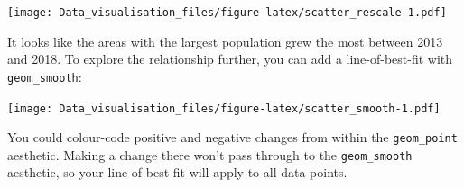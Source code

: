 \documentclass[]{book}
\newenvironment{Shaded}{\begin{snugshade}}{\end{snugshade}}
\newcommand{\CommentTok}[1]{\textcolor[rgb]{0.56,0.35,0.01}{\textit{#1}}}
\newcommand{\DataTypeTok}[1]{\textcolor[rgb]{0.13,0.29,0.53}{#1}}
\newcommand{\DecValTok}[1]{\textcolor[rgb]{0.00,0.00,0.81}{#1}}
\newcommand{\KeywordTok}[1]{\textcolor[rgb]{0.13,0.29,0.53}{\textbf{#1}}}
\newcommand{\NormalTok}[1]{#1}
\newcommand{\OperatorTok}[1]{\textcolor[rgb]{0.81,0.36,0.00}{\textbf{#1}}}
\newcommand{\StringTok}[1]{\textcolor[rgb]{0.31,0.60,0.02}{#1}}
\begin{document}
\texttt{[image: Data\_visualisation\_files/figure-latex/scatter\_rescale-1.pdf]}

It looks like the areas with the largest population grew the most between 2013 and 2018. To explore the relationship further, you can add a line-of-best-fit with \texttt{geom\_smooth}:

\begin{Shaded}
\end{Shaded}

\texttt{[image: Data\_visualisation\_files/figure-latex/scatter\_smooth-1.pdf]}

You could colour-code positive and negative changes from within the \texttt{geom\_point} aesthetic. Making a change there won't pass through to the \texttt{geom\_smooth} aesthetic, so your line-of-best-fit will apply to all data points.
\end{document}
